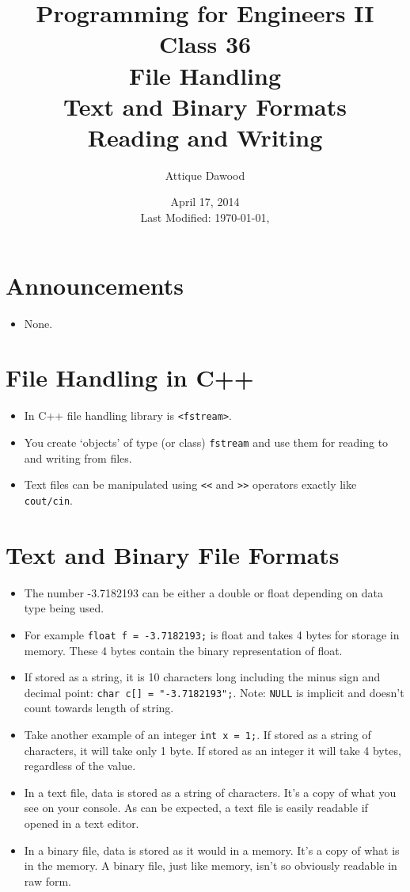 \documentclass[12pt,a4paper]{article}
\title{\vspace{-2cm}Programming for Engineers II\\Class 36\\File Handling\\Text and Binary Formats\\Reading and Writing}
\author{Attique Dawood}
\date{April 17, 2014\\[0.2cm] Last Modified: \today, \currenttime}
\begin{document}
\maketitle
\section{Announcements}
\begin{itemize}
\item None.
\end{itemize}
\section{File Handling in C++}
\begin{itemize}
\item In C++ file handling library is \verb|<fstream>|.
\item You create `objects' of type (or class) \verb|fstream| and use them for reading to and writing from files.
\item Text files can be manipulated using \verb|<<| and \verb|>>| operators exactly like \verb|cout/cin|.
\end{itemize}
\section{Text and Binary File Formats}
\begin{itemize}
\item The number -3.7182193 can be either a double or float depending on data type being used.
\item For example \verb|float f = -3.7182193;| is float and takes 4 bytes for storage in memory. These 4 bytes contain the binary representation of float.
\item If stored as a string, it is 10 characters long including the minus sign and decimal point: \verb|char c[] = "-3.7182193";|. Note: \verb|NULL| is implicit and doesn't count towards length of string.
\item Take another example of an integer \verb|int x = 1;|. If stored as a string of characters, it will take only 1 byte. If stored as an integer it will take 4 bytes, regardless of the value.
\item In a text file, data is stored as a string of characters. It's a copy of what you see on your console. As can be expected, a text file is easily readable if opened in a text editor.
\item In a binary file, data is stored as it would in a memory. It's a copy of what is in the memory. A binary file, just like memory, isn't so obviously readable in raw form.
\end{itemize}
\end{document}
